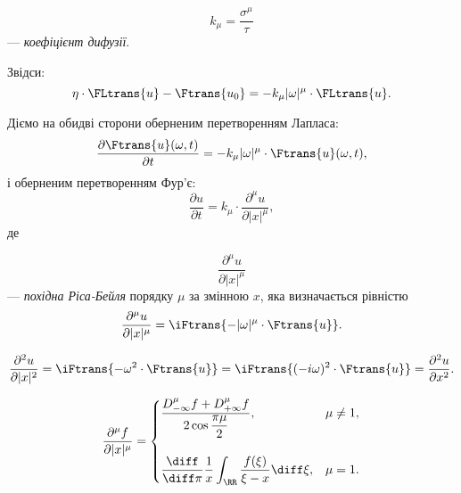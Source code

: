 \begin{definition}
    \nothing
    \begin{equation}
        k_\mu = \frac{\sigma^\mu}{\tau}
    \end{equation}
    --- \textit{коефіцієнт дифузії}.
\end{definition}

Звідси:
\begin{equation}
    \eta \cdot \FLtrans{u} - \Ftrans{u_0} = -k_\mu |\omega|^\mu \cdot \FLtrans{u}.
\end{equation}

Діємо на обидві сторони оберненим перетворенням Лапласа:
\begin{equation}
    \frac{\partial \Ftrans{u}(\omega, t)}{\partial t} = -k_\mu |\omega|^\mu \cdot \Ftrans{u}(\omega, t),
\end{equation}
і оберненим перетворенням Фур'є:
\begin{equation}
    \frac{\partial u}{\partial t} = k_\mu \cdot \frac{\partial^\mu u}{\partial |x|^\mu},
\end{equation}
де 
\begin{definition}
    \nothing
    \begin{equation}
        \frac{\partial^\mu u}{\partial |x|^\mu}
    \end{equation}
    --- \textit{похідна Ріса-Бейля} порядку $\mu$ за змінною $x$, яка визначається рівністю
    \begin{equation}
        \frac{\partial^\mu u}{\partial |x|^\mu} = \iFtrans{-|\omega|^\mu \cdot \Ftrans{u}}.
    \end{equation}
\end{definition}

\begin{remark}
    \begin{equation}
        \frac{\partial^2 u}{\partial |x|^2} = \iFtrans{-\omega^2 \cdot \Ftrans{u}} = \iFtrans{(-i \omega)^2 \cdot \Ftrans{u}} = \frac{\partial^2 u}{\partial x^2}.
    \end{equation}
\end{remark}

\begin{remark}
    \begin{equation}
        \frac{\partial^\mu f}{\partial |x|^\mu} = \begin{cases}
            \dfrac{D_{-\infty}^\mu f + D_{+\infty}^\mu f}{2 \cos \dfrac{\pi \mu}{2}}, & \mu \ne 1, \\
            \\
            \dfrac{\diff}{\diff \pi} \dfrac{1}{x} \displaystyle\int_\RR \dfrac{f(\xi)}{\xi - x} \diff \xi, & \mu = 1.
        \end{cases}
    \end{equation}
\end{remark}
